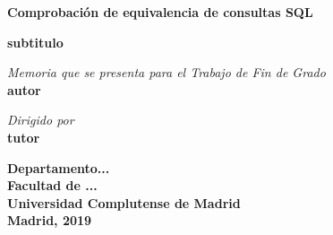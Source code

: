 \begin{titlepage}
\vspace{4cm}
\centering
{\textsf{\huge  \textbf{Comprobación de equivalencia de consultas SQL}}}

\vspace{0.3cm}

{\textsf{\large \textbf{subtitulo} }}

\vspace{7cm}
\textit{Memoria que se presenta para el Trabajo de Fin de Grado}\\
\vspace{5mm}
{\large \textbf{ autor}}

\vspace{2cm}
\textit{Dirigido por}\\
\vspace{5mm}
{\bfseries tutor}

\vfill

\textbf{{Departamento...\\
Facultad de ...\\
Universidad Complutense de Madrid}}\\
\vspace{5mm}
\textbf{Madrid, 2019}
\end{titlepage}
\fantasma